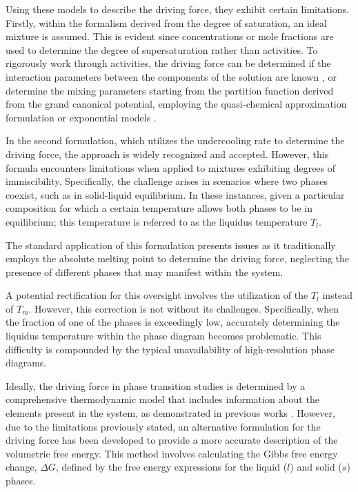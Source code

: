Using these models to describe the driving force, they exhibit certain limitations. Firstly, within the 
formalism derived from the degree of saturation, an ideal mixture is assumed. This is evident since 
concentrations or mole fractions are used to determine the degree of supersaturation rather than activities. 
To rigorously work through activities, the driving force can be determined if the interaction parameters 
between the components of the solution are known \cite{Bartels1991}, or determine the mixing parameters 
starting from the partition function derived from the grand canonical potential, employing the quasi-chemical approximation formulation \cite{Odusote2020} or 
exponential models \cite{Yadav2023}.

In the second formulation, which utilizes the undercooling rate to determine the driving force, the approach is widely 
recognized and accepted. However, this formula encounters limitations when applied to mixtures exhibiting degrees of immiscibility. 
Specifically, the challenge arises in scenarios where two phases coexist, such as in solid-liquid equilibrium. In these instances, 
given a particular composition for which a certain temperature allows both phases to be in equilibrium; this temperature is referred 
to as the liquidus temperature \(T_l\).

The standard application of this formulation presents issues as it traditionally employs the absolute melting point to determine the 
driving force, neglecting the presence of different phases that may manifest within the system.

A potential rectification for this oversight involves the utilization of the \(T_l\) instead of \(T_m\). However, this correction 
is not without its challenges. Specifically, when the fraction of one of the phases is exceedingly low, accurately determining the 
liquidus temperature within the phase diagram becomes problematic. This difficulty is compounded by the typical unavailability of high-resolution phase diagrams.


Ideally, the driving force in phase transition studies is determined by a comprehensive thermodynamic model that includes 
information about the elements present in the system, as demonstrated in previous works \cite{Was1985, Kumar1996}. However, 
due to the limitations previously stated, an alternative formulation for the driving force has been developed to provide a more 
accurate description of the volumetric free energy. This method involves calculating the Gibbs free energy change, \(\Delta G\), 
defined by the free energy expressions for the liquid (\(l\)) and solid (\(s\)) phases.

